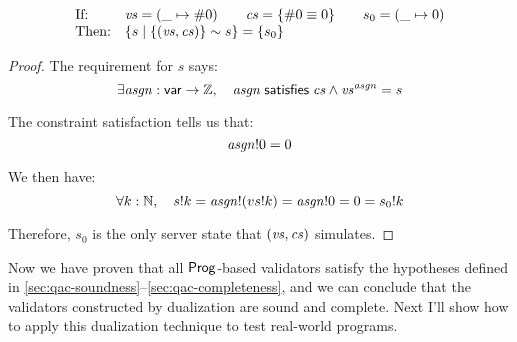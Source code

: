 \begin{lemma}[\ref{eq:rc3}]
\[\begin{array}{ll}
\text{If:}&
\mathit{vs}=(\_\mapsto\#0)\qquad
\mathit{cs}=\{\#0\equiv0\}\qquad
s_0=(\_\mapsto0)\\
\text{Then:}&\{s\mid\{(\mathit{vs},\mathit{cs})\}\sim s\}=\{s_0\}
\end{array}\]
\begin{proof}
The requirement for $s$ says:
\[\exists \mathit{asgn}:\mathsf{var}\to\mathbb Z,\quad\mathit{asgn}\;\mathsf{satisfies}\;\mathit{cs}\wedge \mathit{vs}^{\mathit{asgn}}=s\]

The constraint satisfaction tells us that:
\[\mathit{asgn}!0=0\]

We then have:
\[\forall k:\mathbb N,\quad s!k=\mathit{asgn}!(vs!k)=\mathit{asgn}!0=0=s_0!k\]

Therefore, $s_0$ is the only server state that $(\mathit{vs},\mathit{cs})$ simulates.
\end{proof}
\end{lemma}

Now we have proven that all $\mathsf{Prog}$-based validators satisfy the hypotheses
defined in \autoref{sec:qac-soundness}--\ref{sec:qac-completeness}, and we can
conclude that the validators constructed by dualization are sound and complete.
Next I'll show how to apply this dualization technique to test real-world
programs.
